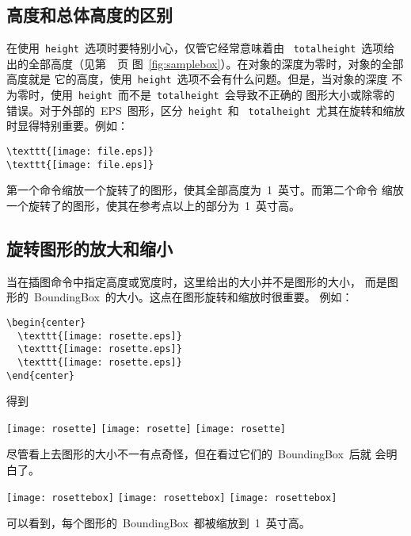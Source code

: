 \subsection{高度和总体高度的区别}\label{ssec:diffheight}

在使用~\texttt{height}~选项时要特别小心，仅管它经常意味着由
~\texttt{totalheight}~选项给出的全部高度（见第~\pageref{fig:samplebox}~页
图~\ref{fig:samplebox}）。在对象的深度为零时，对象的全部高度就是
它的高度，使用~\texttt{height}~选项不会有什么问题。但是，当对象的深度
不为零时，使用~\texttt{height}~而不是~\texttt{totalheight}~会导致不正确的
图形大小或除零的错误。对于外部的~EPS~图形，区分~\texttt{height}~和
~\texttt{totalheight}~尤其在旋转和缩放时显得特别重要。例如：
\begin{Verbatim}[xleftmargin=1cm]
\texttt{[image: file.eps]}
\texttt{[image: file.eps]}
\end{Verbatim}
第一个命令缩放一个旋转了的图形，使其全部高度为~1~英寸。而第二个命令
缩放一个旋转了的图形，使其在参考点以上的部分为~1~英寸高。

\subsection{旋转图形的放大和缩小}\label{ssec:enlarge}

当在插图命令中指定高度或宽度时，这里给出的大小并不是图形的大小，
而是图形的~BoundingBox~的大小。这点在图形旋转和缩放时很重要。
例如：

\begin{Verbatim}[xleftmargin=1cm]
\begin{center}
  \texttt{[image: rosette.eps]}
  \texttt{[image: rosette.eps]}
  \texttt{[image: rosette.eps]}
\end{center}
\end{Verbatim}
得到

\begin{center}
  \texttt{[image: rosette]}
  \texttt{[image: rosette]}
  \texttt{[image: rosette]}
\end{center}
尽管看上去图形的大小不一有点奇怪，但在看过它们的~BoundingBox~后就
会明白了。

\begin{center}
  \texttt{[image: rosettebox]}
  \texttt{[image: rosettebox]}
  \texttt{[image: rosettebox]}
\end{center}
可以看到，每个图形的~BoundingBox~都被缩放到~1~英寸高。

